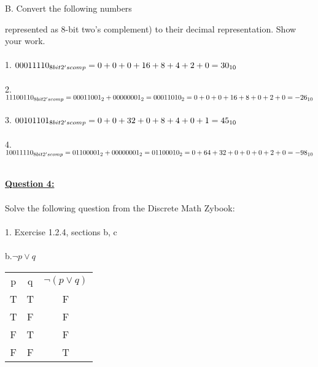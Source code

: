 \documentclass[11pt]{article}
\begin{document}
B. Convert the following numbers {represented as 8-bit two's complement) to their decimal representation. Show your work.\\\\
1. $00011110_{8 bit 2's comp} =  0 + 0 + 0 + 16 + 8 + 4 + 2 + 0 \\= 30_{10}$\\\\
2. $11100110_{8 bit 2's comp} = 00011001_{2} + 00000001_{2} \\
= 00011010_{2} = 0 + 0 + 0 + 16 + 8 + 0 + 2 + 0 \\= -26_{10} $\\\\
3. $00101101_{8 bit 2's comp} = 0 + 0 + 32 + 0 + 8 + 4 + 0 + 1 \\= 45_{10} $\\\\
4. $10011110_{8 bit 2's comp} = 01100001_{2} + 00000001_{2} \\ = 01100010_{2} = 0 + 64 + 32 + 0 + 0 + 0 + 2 + 0 \\= -98_{10} $\\\\

\pagebreak

\noindent \textbf{\ul{Question 4:}} \\
\\
Solve the following question from the Discrete Math Zybook: \\\\
1. Exercise 1.2.4, sections b, c \\\\
b.${\displaystyle \neg } p \vee q$ \\
\begin{center}
\begin{tabular}{ |c|c|c| } 
 \hline
 p & q & ${\displaystyle \neg }(p \vee q)$ \\ 
 T & T & F \\ 
 T & F & F \\ 
 F & T & F \\ 
 F & F & T \\ 
 \hline
\end{tabular}
\end{center} 

}
\end{document}
